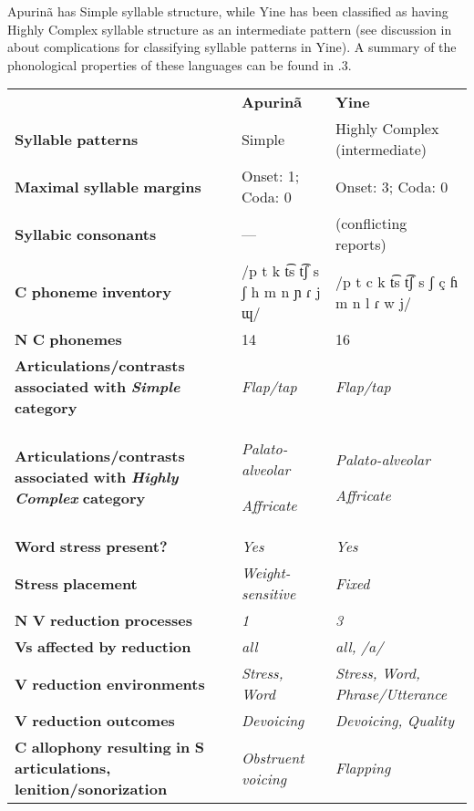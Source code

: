   Apurinã has Simple syllable structure, while Yine has been classified as having Highly Complex syllable structure as an intermediate pattern (see discussion in  about complications for classifying syllable patterns in Yine). A summary of the phonological properties of these languages can be found in .3.






\begin{table}
\begin{tabularx}{\textwidth}{XXX}
\lsptoprule
 & \textbf{Apurinã} & \textbf{Yine}\\
 \textbf{Syllable} \textbf{patterns} & Simple & Highly Complex (intermediate)\\
 \textbf{Maximal} \textbf{syllable} \textbf{margins} & Onset: 1; Coda: 0 & Onset: 3; Coda: 0\\
 \textbf{Syllabic} \textbf{consonants} & — & (conflicting reports)\\
 \textbf{C} \textbf{phoneme} \textbf{inventory} & /p t k t͡s t͡ʃ s ʃ h m n ɲ ɾ j ɰ/ & /p t c k t͡s t͡ʃ s ʃ ç ɦ m n l ɾ w j/\\
 \textbf{N} \textbf{C} \textbf{phonemes} & 14 & 16\\
 \textbf{Articulations/contrasts} \textbf{associated} \textbf{with} \textbf{\textit{Simple}} \textbf{category} & \textit{Flap/tap} & \textit{Flap/tap}\\
 \textbf{Articulations/contrasts} \textbf{associated} \textbf{with} \textbf{\textit{Highly} \textit{Complex}} \textbf{category} & { \textit{Palato-alveolar}}

 \textit{Affricate} & { \textit{Palato-alveolar}}

 \textit{Affricate}\\
 \textbf{Word} \textbf{stress} \textbf{present?} & \textit{Yes} & \textit{Yes}\\
 \textbf{Stress} \textbf{placement} & \textit{Weight-sensitive} & \textit{Fixed}\\
 \textbf{N} \textbf{V} \textbf{reduction} \textbf{processes} & \textit{1} & \textit{3}\\
 \textbf{Vs} \textbf{affected} \textbf{by} \textbf{reduction}  & \textit{all} & \textit{all,} \textit{/a/}\\
 \textbf{V} \textbf{reduction} \textbf{environments} & \textit{Stress,} \textit{Word} & \textit{Stress,} \textit{Word,} \textit{Phrase/Utterance}\\
 \textbf{V} \textbf{reduction} \textbf{outcomes} & \textit{Devoicing} & \textit{Devoicing,} \textit{Quality}\\
 \textbf{C} \textbf{allophony} \textbf{resulting} \textbf{in} \textbf{S} \textbf{articulations,} \textbf{lenition/sonorization} & \textit{Obstruent} \textit{voicing} & { \textit{Flapping}}


\end{tabularx}
\end{table}
